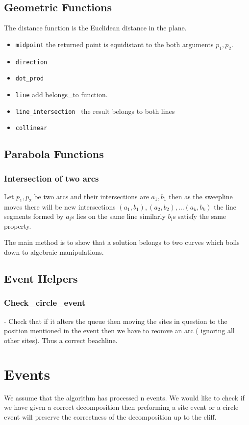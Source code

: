 \documentclass{article}
\begin{document}
\subsection{Geometric Functions}
The distance function is the Euclidean distance in the plane. 
\begin{itemize}
    \item {\tt midpoint} the returned point is equidistant to the both arguments $p_1, p_2$. 
    \item {\tt direction} 
    \item {\tt dot\_prod}
    \item {\tt line} add belongs\_to function.
    \item {\tt line\_intersection } the result belongs to both lines
    \item {\tt collinear} 
\end{itemize}

\subsection{Parabola Functions}
\subsubsection{Intersection of two arcs}
Let $p_1, p_2$ be two arcs and their intersections are $a_1, b_1$ then as the sweepline moves there will be new intersections $\left(a_1, b_1\right),\left(a_2, b_2\right),\dots \left(a_k, b_k\right)$ the line segments formed by $a_i$s lies on the same line similarly  $b_i$s satisfy the same property.

The main method is to show that a solution belongs to two curves which boils down to algebraic manipulations.

\subsection{Event Helpers}

\subsubsection{Check\_circle\_event}

- Check that if it alters the queue then moving the sites in question to the position mentioned in the event then we have to reomve an arc ( ignoring all other sites). Thus a correct beachline.



\section{Events}
We assume that the algorithm has processed n events. We would like to check if we have given a correct decomposition then preforming a site event or a circle event will preserve the correctness of the decomposition up to the cliff.
\end{document}
